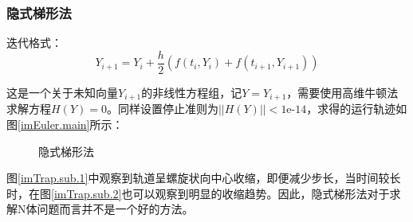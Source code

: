 \documentclass{article}
\begin{document}
\subsubsection{隐式梯形法} 
\par 迭代格式：
$$
Y_{i+1} = Y_i + \frac{h}{2}(f(t_i,Y_i) + f(t_{i+1},Y_{i+1}))
$$
\par 这是一个关于未知向量$Y_{i+1}$的非线性方程组，记$Y=Y_{i+1}$，需要使用高维牛顿法求解方程$H(Y)=0$。同样设置停止准则为$||H(Y)||<\text{1e-14}$，求得的运行轨迹如图\ref{imEuler.main}所示：
\begin{figure}[H]
	\centering  %
	\caption{隐式梯形法}
	\label{imTrap.main}
\end{figure}
\par 图\ref{imTrap.sub.1}中观察到轨道呈螺旋状向中心收缩，即便减少步长，当时间较长时，在图\ref{imTrap.sub.2}也可以观察到明显的收缩趋势。因此，隐式梯形法对于求解N体问题而言并不是一个好的方法。
\end{document}
